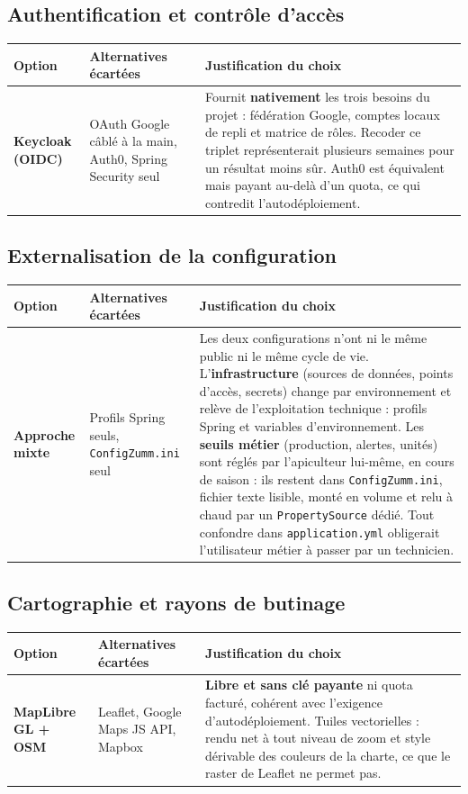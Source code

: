 \subsection{Authentification et contrôle d'accès}
\begin{xltabular}{\textwidth}{>{\bfseries}p{2.7cm} p{4.2cm} X}
\toprule
\textbf{Option} & \textbf{Alternatives écartées} & \textbf{Justification du choix} \\
\midrule
\endhead
Keycloak (OIDC) & OAuth Google câblé à la main, Auth0, Spring Security seul & Fournit \textbf{nativement} les trois besoins du projet : fédération Google, comptes locaux de repli et matrice de rôles. Recoder ce triplet représenterait plusieurs semaines pour un résultat moins sûr. Auth0 est équivalent mais payant au-delà d'un quota, ce qui contredit l'autodéploiement. \\
\bottomrule
\end{xltabular}

\subsection{Externalisation de la configuration}
\begin{xltabular}{\textwidth}{>{\bfseries}p{2.7cm} p{4.2cm} X}
\toprule
\textbf{Option} & \textbf{Alternatives écartées} & \textbf{Justification du choix} \\
\midrule
\endhead
Approche mixte & Profils Spring seuls, \texttt{ConfigZumm.ini} seul & Les deux configurations n'ont ni le même public ni le même cycle de vie. L'\textbf{infrastructure} (sources de données, points d'accès, secrets) change par environnement et relève de l'exploitation technique : profils Spring et variables d'environnement. Les \textbf{seuils métier} (production, alertes, unités) sont réglés par l'apiculteur lui-même, en cours de saison : ils restent dans \texttt{ConfigZumm.ini}, fichier texte lisible, monté en volume et relu à chaud par un \texttt{PropertySource} dédié. Tout confondre dans \texttt{application.yml} obligerait l'utilisateur métier à passer par un technicien. \\
\bottomrule
\end{xltabular}

\subsection{Cartographie et rayons de butinage}
\begin{xltabular}{\textwidth}{>{\bfseries}p{2.7cm} p{4.2cm} X}
\toprule
\textbf{Option} & \textbf{Alternatives écartées} & \textbf{Justification du choix} \\
\midrule
\endhead
MapLibre GL + OSM & Leaflet, Google Maps JS API, Mapbox & \textbf{Libre et sans clé payante} ni quota facturé, cohérent avec l'exigence d'autodéploiement. Tuiles vectorielles : rendu net à tout niveau de zoom et style dérivable des couleurs de la charte, ce que le raster de Leaflet ne permet pas. \\
\bottomrule
\end{xltabular}

